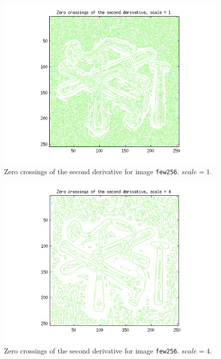 \begin{figure}[H]
	\centering
	\includegraphics[scale=0.8]{./images/Q5/vv/1.png}
	\caption{Zero crossings of the second derivative for image \texttt{few256}. $scale = 1$.}
	\label{fig:Q5_vv_1}
\end{figure}

\begin{figure}[H]
	\centering
	\includegraphics[scale=0.8]{./images/Q5/vv/4.png}
	\caption{Zero crossings of the second derivative for image \texttt{few256}. $scale = 4$.}
	\label{fig:Q5_vv_4}
\end{figure}

